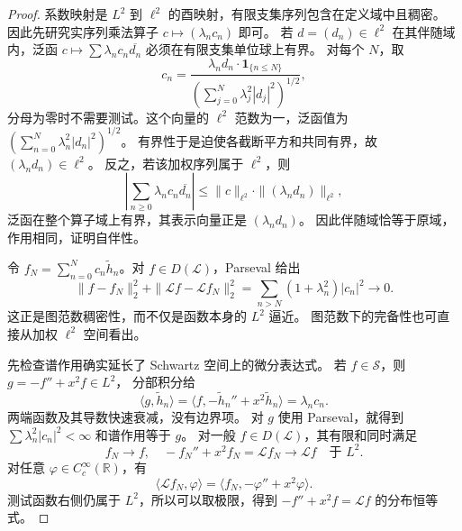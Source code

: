 \begin{proof}
系数映射是 \(L^2\) 到 \(\ell^2\) 的酉映射，有限支集序列包含在定义域中且稠密。
因此先研究实序列乘法算子 \(c\mapsto(\lambda_nc_n)\) 即可。
若 \(d=(d_n)\in\ell^2\) 在其伴随域内，泛函
\(c\mapsto\sum\lambda_nc_n\overline{d_n}\) 必须在有限支集单位球上有界。
对每个 \(N\)，取
\[
 c_n=
 \frac{\lambda_nd_n\cdot\mathbf1_{\{n\leq N\}}}
 {(\sum_{j=0}^N\lambda_j^2|d_j|^2)^{1/2}},
\]
分母为零时不需要测试。这个向量的 \(\ell^2\) 范数为一，泛函值为
\((\sum_{n=0}^N\lambda_n^2|d_n|^2)^{1/2}\)。
有界性于是迫使各截断平方和共同有界，故 \((\lambda_nd_n)\in\ell^2\)。
反之，若该加权序列属于 \(\ell^2\)，则
\[
 \left|\sum_{n\geq0}\lambda_nc_n\overline{d_n}\right|
 \leq\|c\|_{\ell^2}\cdot\|(\lambda_nd_n)\|_{\ell^2},
\]
泛函在整个算子域上有界，其表示向量正是 \((\lambda_nd_n)\)。
因此伴随域恰等于原域，作用相同，证明自伴性。

令 \(f_N=\sum_{n=0}^Nc_n\widetilde h_n\)。对 \(f\in D(\mathcal L)\)，Parseval 给出
\[
 \|f-f_N\|_2^2+\|\mathcal Lf-\mathcal Lf_N\|_2^2
 =\sum_{n>N}(1+\lambda_n^2)|c_n|^2\longrightarrow0.
\]
这正是图范数稠密性，而不仅是函数本身的 \(L^2\) 逼近。
图范数下的完备性也可直接从加权 \(\ell^2\) 空间看出。

先检查谱作用确实延长了 Schwartz 空间上的微分表达式。
若 \(f\in\mathcal S\)，则 \(g=-f''+x^2f\in L^2\)，
分部积分给
\[
 \langle g,\widetilde h_n\rangle
 =\langle f,-\widetilde h_n''+x^2\widetilde h_n\rangle
 =\lambda_nc_n.
\]
两端函数及其导数快速衰减，没有边界项。
对 \(g\) 使用 Parseval，就得到 \(\sum\lambda_n^2|c_n|^2<\infty\) 和谱作用等于 \(g\)。
对一般 \(f\in D(\mathcal L)\)，其有限和同时满足
\[
 f_N\to f,\quad
 -f_N''+x^2f_N=\mathcal Lf_N\to\mathcal Lf
 \quad\text{于 }L^2.
\]
对任意 \(\varphi\in C_c^\infty(\mathbb R)\)，有
\[
 \langle\mathcal Lf_N,\varphi\rangle
 =\langle f_N,-\varphi''+x^2\varphi\rangle.
\]
测试函数右侧仍属于 \(L^2\)，所以可以取极限，得到
\(-f''+x^2f=\mathcal Lf\) 的分布恒等式。


\end{proof}
